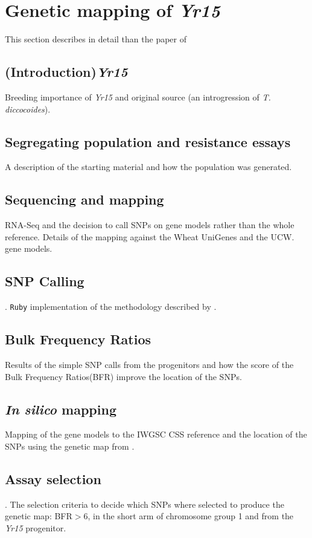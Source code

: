 
\chapter{Genetic mapping of \textit{Yr15}}

This section describes in detail than the paper of \citet{Ramirez-Gonzalez-2014}


\section{(Introduction)\textit{Yr15}} 
Breeding importance of \textit{Yr15} and original source (an introgression of \textit{T. diccocoides}). 

\section{Segregating population and resistance essays}
A description of the starting material and how the population was generated.  

\section{Sequencing and mapping} RNA-Seq and the decision to call SNPs on gene models rather than the whole reference.  Details of the mapping against the Wheat UniGenes \cite{PontiusJUWagnerL2002} and the UCW. \cite{Krasileva2013} gene models.  
\section{SNP Calling}. 
\verb|Ruby| implementation of the methodology described by \citet{Trick2012}. 

\section{Bulk Frequency Ratios} 
Results of the simple SNP calls from the progenitors and how the score of the Bulk Frequency Ratios(BFR) improve the location of the SNPs. 

\section{\textit{In silico} mapping}
Mapping of the gene models to the IWGSC CSS \cite{Mayer2014} reference and the location of the SNPs using the genetic map from \citet{Wang2014}.

\section{Assay selection}. 
The selection criteria to decide which SNPs where selected to produce the genetic map: BFR$>$6, in the short arm of chromosome group 1 and from the \textit{Yr15} progenitor.

